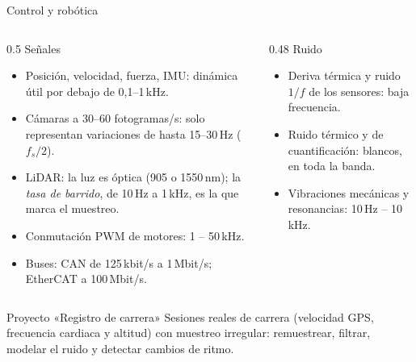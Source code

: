 \documentclass[aspectratio=169,11pt]{beamer}
\begin{document}
\begin{frame}{Control y robótica}
  \begin{columns}[T]
    \begin{column}{0.5\textwidth}
      \alert{Señales}
      \begin{itemize}\footnotesize
        \item Posición, velocidad, fuerza, IMU: dinámica útil por debajo de 0,1–1\,kHz.
        \item Cámaras a 30–60 fotogramas/s: solo representan variaciones de hasta 15–30\,Hz ($f_s/2$).
        \item LiDAR: la luz es óptica (905 o 1550\,nm); la \emph{tasa de barrido}, de 10\,Hz a 1\,kHz, es la que marca el muestreo.
        \item Conmutación PWM de motores: 1 – 50\,kHz.
        \item Buses: CAN de 125\,kbit/s a 1\,Mbit/s; EtherCAT a 100\,Mbit/s.
      \end{itemize}
    \end{column}
    \begin{column}{0.48\textwidth}
      \alert{Ruido}
      \begin{itemize}\footnotesize
        \item Deriva térmica y ruido $1/f$ de los sensores: baja frecuencia.
        \item Ruido térmico y de cuantificación: blancos, en toda la banda.
        \item Vibraciones mecánicas y resonancias: 10\,Hz – 10\,kHz.
      \end{itemize}
    \end{column}
  \end{columns}
  \vspace{-1mm}
  \begin{block}{Proyecto «Registro de carrera»}
    \small Sesiones reales de carrera (velocidad GPS, frecuencia cardiaca y altitud) con muestreo irregular: remuestrear, filtrar, modelar el ruido y detectar cambios de ritmo.
  \end{block}
\end{frame}
\end{document}
